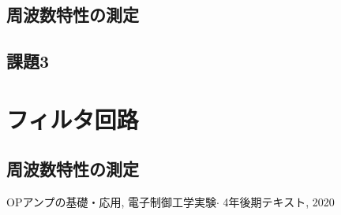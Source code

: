 \documentclass[titlepage]{jsarticle}
\begin{document}
        \subsection{周波数特性の測定}

    \subsection{課題3}

\section{フィルタ回路}

    \subsection{周波数特性の測定}
    
\begin{thebibliography}{99}
     OPアンプの基礎・応用, 電子制御工学実験$\cdot$ 4年後期テキスト, 2020
\end{thebibliography}
\end{document}
